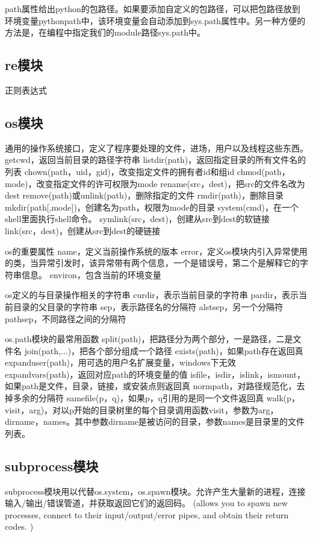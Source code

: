 \documentclass[twoside,11pt]{book}
\begin{document}
path属性给出python的包路径。如果要添加自定义的包路径，可以把包路径放到环境变量pythonpath中，该环境变量会自动添加到sys.path属性中。另一种方便的方法是，在编程中指定我们的module路径sys.path中。

\subsection{re模块}
正则表达式

\subsection{os模块}
通用的操作系统接口，定义了程序要处理的文件，进场，用户以及线程这些东西。
getcwd，返回当前目录的路径字符串
listdir(path)，返回指定目录的所有文件名的列表
chown(path，uid，gid)，改变指定文件的拥有者id和组id
chmod(path，mode)，改变指定文件的许可权限为mode
rename(src，dest)，把src的文件名改为dest
remove(path)或unlink(path)，删除指定的文件
rmdir(path)，删除目录
mkdir(path[,mode])，创建名为path，权限为mode的目录
system(cmd)，在一个shell里面执行shell命令。
symlink(src，dest)，创建从src到dest的软链接
link(src，dest)，创建从src到dest的硬链接

os的重要属性
name，定义当前操作系统的版本
error，定义os模块内引入异常使用的类，当异常引发时，该异常带有两个信息，一个是错误号，第二个是解释它的字符串信息。
environ，包含当前的环境变量

os定义的与目录操作相关的字符串
curdir，表示当前目录的字符串
pardir，表示当前目录的父目录的字符串
sep，表示路径名的分隔符
alstsep，另一个分隔符
pathsep，不同路径之间的分隔符

os.path模块的最常用函数
split(path)，把路径分为两个部分，一是路径，二是文件名
join(path,...)，把各个部分组成一个路径
exists(path)，如果path存在返回真
expanduser(path)，用可选的用户名扩展变量，windows下无效
expandvars(path)，返回对应path的环境变量的值
isfile，isdir，islink，ismount，如果path是文件，目录，链接，或安装点则返回真
normpath，对路径规范化，去掉多余的分隔符
samefile(p，q)，如果p，q引用的是同一个文件返回真
walk(p，visit，arg)，对以p开始的目录树里的每个目录调用函数visit，参数为arg，dirname，names。其中参数dirname是被访问的目录，参数names是目录里的文件列表。

\subsection{subprocess模块}
subprocess模块用以代替os.system，os.spawn模块。允许产生大量新的进程，连接输入/输出/错误管道，并获取返回它们的返回码。
(allows you to spawn new processes, connect to their input/output/error pipes, and obtain their return codes. )
\end{document}
